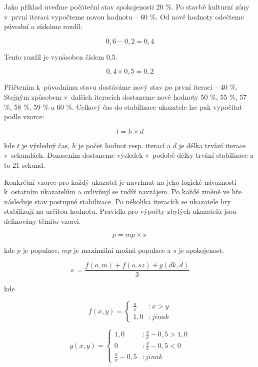 \documentclass[twoside,12pt]{article}
\begin{document}
 Jako příklad uveďme počáteční stav spokojenosti 20 \%. Po stavbě kulturní zóny v~první iteraci vypočteme novou hodnotu -- 60 \%.  Od nové hodnoty odečteme původní a získáme rozdíl: 
 
 $$ 0,6 - 0,2 = 0,4 $$
 
 Tento rozdíl je vynásoben číslem 0,5.
 
 $$ 0,4 \times 0,5 =  0,2 $$
 
 Přičtením k~původnímu stavu dostáváme nový stav po první iteraci -- 40 \%. Stejným způsobem v~dalších iteracích dostaneme nové hodnoty 50 \%, 55 \%, 57 \%, 58 \%, 59 \% a 60 \%. Celkový čas do stabilizace ukazatele lze pak vypočítat podle vzorce:
 
 \begin{equation}
t = h \times d
\end{equation}
 
 kde $t$ je výsledný čas, $h$ je počet hodnot resp. iterací a $d$ je délka trvání iterace v~sekundách.
Dozasením dostaneme výsledek v~podobě délky trvání stabilizace a to 21 sekund.
 
 Konkrétní vzorec pro každý ukazatel je navrhnut na jeho logické návaznosti k~ostatním ukazatelům a ovlivňují se tudíž navzájem. Po každé změně ve hře následuje stav postupné stabilizace. Po několika iteracích se ukazatele hry stabilizují na určitou hodnotu. Pravidla pro výpočty zbylých ukazatelů jsou definovány těmito vzorci.
 
 
 \begin{equation}
p = mp \times
s~\end{equation}
 
 kde $p$ je populace, $mp$ je maximální možná populace a $s$ je spokojenost.
 

\begin{equation}
s~= \frac{f(o,m) + f(o, sz) + g(dk, d)}{3}
\end{equation}

kde

\begin{equation}
f(x, y) = \left\{
  \begin{array}{lr}
     \frac{y}{x} & : x > y\\
    1,0 & : jinak
  \end{array}
\right.
\end{equation}

\begin{equation}
g(x, y) = \left\{
  \begin{array}{lr}
     1,0 & : \frac{y}{x} - 0,5 > 1,0\\
     0 & : \frac{y}{x} - 0,5 < 0\\
    \frac{y}{x} - 0,5 & : jinak
  \end{array}
\right.
\end{equation}
\end{document}
